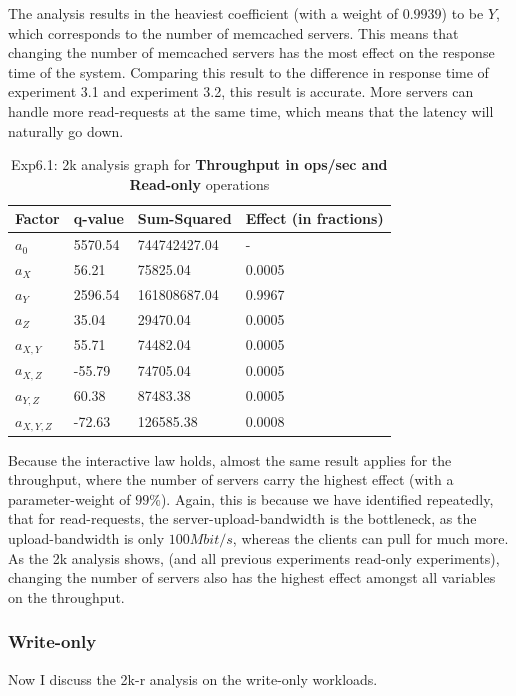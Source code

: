 \documentclass[11pt,a4paper]{article}
\begin{document}
The analysis results in the heaviest coefficient (with a weight of $0.9939$) to be $Y$, which corresponds to the number of memcached servers.
This means that changing the number of memcached servers has the most effect on the response time of the system.
Comparing this result to the difference in response time of experiment 3.1 and experiment 3.2, this result is accurate.
More servers can handle more read-requests at the same time, which means that the latency will naturally go down.

\begin{center}
	\begin{table}[H]
	\center
    \begin{tabular}{ | l | l | l | l |  }
    \hline
    Factor & q-value & Sum-Squared & Effect (in fractions) \\ \hline
    $a_0$ & 5570.54 & 744742427.04 & - \\ \hline
    $a_X$ & 56.21 & 75825.04 & 0.0005	 \\ \hline
    $a_Y$ & 2596.54 & 161808687.04 & 0.9967 \\ \hline
    $a_Z$ & 35.04  & 29470.04	 & 0.0005 \\ \hline
   	$a_{X, Y}$ & 55.71 & 74482.04	 & 0.0005 \\ \hline
    $a_{X, Z}$ & -55.79 & 74705.04 & 0.0005 \\ \hline
    $a_{Y, Z}$ & 60.38 & 87483.38 & 0.0005 \\ \hline
    $a_{X, Y, Z}$ & -72.63 & 126585.38 & 0.0008 \\
    \hline
    \end{tabular}
  	\caption{Exp6.1: 2k analysis graph for \textbf{Throughput in ops/sec and Read-only} operations}	 
  	\end{table}  
\end{center}

Because the interactive law holds, almost the same result applies for the throughput, where the number of servers carry the highest effect (with a parameter-weight of $ 99 \% $).
Again, this is because we have identified repeatedly, that for read-requests, the server-upload-bandwidth is the bottleneck, as the upload-bandwidth is only $ 100Mbit/s $, whereas the clients can pull for much more.
As the 2k analysis shows, (and all previous experiments read-only experiments), changing the number of servers also has the highest effect amongst all variables on the throughput.

\subsubsection{Write-only}
Now I discuss the 2k-r analysis on the write-only workloads.
\end{document}
